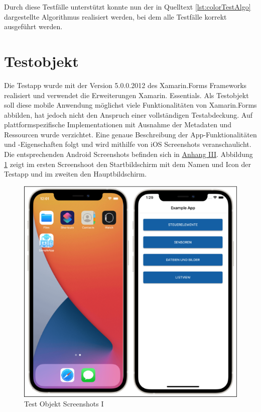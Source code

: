 Durch diese Testfälle unterstützt konnte nun der in Quelltext \ref{lst:colorTestAlgo} dargestellte Algorithmus realisiert werden,  bei dem alle Testfälle korrekt ausgeführt werden.
\newpage




\section{Testobjekt}
Die Testapp wurde mit der Version 5.0.0.2012 des Xamarin.Forms Frameworks realisiert und verwendet die Erweiterungen Xamarin. Essentials.  Als Testobjekt soll diese mobile Anwendung möglichst viele Funktionalitäten von Xamarin.Forms abbilden,  hat jedoch nicht den Anspruch einer vollständigen Testabdeckung.
Auf plattformspezifische Implementationen mit Ausnahme der Metadaten und Ressourcen wurde verzichtet.  Eine genaue Beschreibung der App-Funktionalitäten und -Eigenschaften folgt und wird mithilfe von iOS Screenshots veranschaulicht.  Die entsprechenden Android Screenshots befinden sich in \hyperref[chap:AnhangAndroidScreenshots]{Anhang III}.  Abbildung \ref{fig:TestObjectI} zeigt im ersten Screenshoot den Startbildschirm mit dem Namen und Icon der Testapp und im zweiten den Hauptbildschirm.  


\begin{figure}[!ht]
 \includegraphics[width=\textwidth,keepaspectratio]{Images/Screenshot/AppIconAndMenu.png}
 \caption{Test Objekt Screenshots I}
 \label{fig:TestObjectI}
\end{figure}

